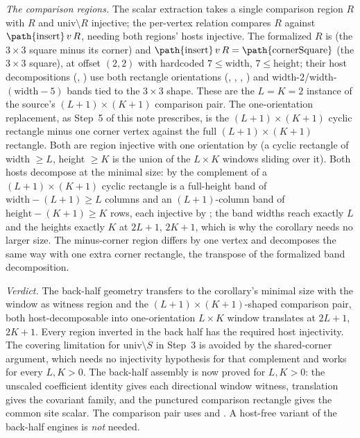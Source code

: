 \documentclass{article}
\begin{document}
\emph{The comparison regions.} The scalar extraction
 takes a single comparison region $R$
with $R$ and $\mathrm{univ}\setminus R$ injective; the per-vertex relation
 compares $R$ against
$\text{\path{insert}}\,v\,R$, needing both regions' hosts injective. The formalized $R$
is  (the $3\times3$ square minus its corner) and
$\text{\path{insert}}\,v\,R = \text{\path{cornerSquare}}$ (the $3\times3$ square), at offset
$(2,2)$ with hardcoded $7\leq\mathrm{width}$, $7\leq\mathrm{height}$; their host
decompositions (,
) use both rectangle orientations
(, , , )
and width-$2$/width-$(\mathrm{width}-5)$ bands tied to the $3\times3$ shape. These
are the $L=K=2$ instance of the source's $(L+1)\times(K+1)$ comparison pair. The
one-orientation replacement, as Step~5 of this note prescribes, is the
$(L+1)\times(K+1)$ cyclic rectangle minus one corner vertex against the full
$(L+1)\times(K+1)$ rectangle. Both are region injective with one orientation by
 (a cyclic rectangle of width $\geq L$, height
$\geq K$ is the union of the $L\times K$ windows sliding over it). Both hosts
decompose at the minimal size: by  the complement
of a $(L+1)\times(K+1)$ cyclic rectangle is a full-height band of
$\mathrm{width}-(L+1)\geq L$ columns and an $(L+1)$-column band of
$\mathrm{height}-(K+1)\geq K$ rows, each injective by
; the band widths reach exactly $L$ and the
heights exactly $K$ at $2L+1$, $2K+1$, which is why the corollary needs no larger
size. The minus-corner region differs by one vertex and decomposes the same way
with one extra corner rectangle, the transpose of the formalized
 band decomposition.

\emph{Verdict.} The back-half geometry transfers to the corollary's minimal size with the
window as witness region and the $(L+1)\times(K+1)$-shaped comparison pair, both
host-decomposable into one-orientation $L\times K$ window translates at $2L+1$,
$2K+1$. Every region inverted in the back half has the required host
injectivity. The covering limitation for $\mathrm{univ}\setminus S$ in
Step~3 is avoided by the shared-corner argument, which needs no
injectivity hypothesis for that complement and works for every $L,K>0$. The
back-half assembly is now proved for $L,K>0$: the unscaled coefficient
identity gives each directional window witness, translation gives the
covariant family, and the punctured comparison rectangle gives the common
site scalar. The comparison pair uses
 and
. A host-free variant of the back-half engines is \emph{not}
needed.
\end{document}
